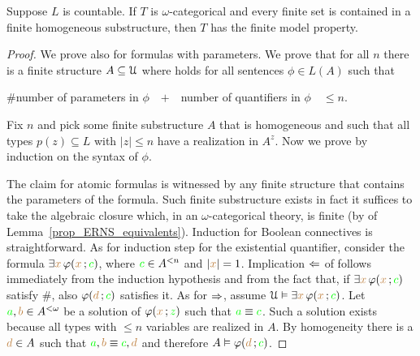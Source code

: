 \begin{lemma}\label{lem_zilbergiocattolo} Suppose $L$ is countable.
If $T$ is $\omega$-categorical and every finite set is contained in a finite homogeneous substructure, then $T$ has the finite model property.
\end{lemma}
\begin{proof}
We prove  also for formulas with parameters.
We prove that for all $n$ there is a finite structure $A\subseteq\EuScript U$ where  holds for all sentences $\phi\in L(A)$ such that

$\#$\hfil number of parameters in $\phi$\ \  $+$\ \  number of quantifiers in $\phi$\ \ $\le n$.

Fix $n$ and pick some finite substructure $A$ that is homogeneous and such that all types $p(z)\subseteq L$ with $|z|\le n$ have a realization in $A^z$.
Now we prove  by induction on the syntax of $\phi$.

The claim for atomic formulas is witnessed by any finite structure that contains the parameters of the formula.
Such finite substructure exists in fact it suffices to take the algebraic closure which, in an $\omega$-categorical theory, is finite (by  of Lemma~\ref{prop_ERNS_equivalents}).
Induction for Boolean connectives is straightforward.
As for induction step for the existential quantifier, consider the formula $\exists {\color{brown}x}\,\varphi({\color{brown} x}\,;{\color{green} c})$, where ${\color{green} c}\in A^{<n}$ and $|{\color{brown} x}|=1$.
Implication $\Leftarrow$ of  follows immediately from the induction hypothesis and from the fact that, if $\exists {\color{brown}x}\,\varphi({\color{brown} x}\,;{\color{green} c})$ satisfy $\#$, also $\varphi({\color{brown} d}\,;{\color{green} c})$ satisfies it.
As for $\Rightarrow$, assume $\EuScript U\vDash\exists {\color{brown}x}\, \varphi({\color{brown} x}\,;{\color{green} c})$.
Let ${\color{green} a},{\color{brown} b}\in A^{<\omega}$ be a solution of $\varphi({\color{brown} x}\,;{\color{green} z})$ such that ${\color{green} a}\equiv{\color{green}c}$.
Such a solution exists because all types with $\le n$ variables are realized in $A$.
By homogeneity there is a ${\color{brown} d}\in A$ such that ${\color{green} a},{\color{brown} b}\equiv {\color{green}c},{\color{brown} d}$ and therefore $A\vDash\varphi({\color{brown} d}\,;{\color{green} c})$.%
\end{proof}

